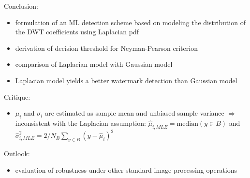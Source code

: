 \begin{frame}{\insertsection}

\textcolor{TUDblue}{Conclusion:}
\begin{itemize}
\item formulation of an ML detection scheme based on modeling the distribution of the DWT coefficients using Laplacian pdf
\item derivation of decision threshold for Neyman-Pearson criterion
\item comparison of Laplacian model with Gaussian model
\item Laplacian model yields a better watermark detection than Gaussian model
\end{itemize}

\textcolor{TUDblue}{Critique:}

\begin{itemize}
 \item $\mu_i$ and $\sigma_i$ are estimated as sample mean and unbiased sample variance 
\newline \textcolor{TUDblue}{$\Rightarrow$} inconsistent with the Laplacian assumption:
\newline $\hat{\mu}_{i, MLE} = \text{median}(y\in B)$ and $\hat{\sigma}^2_{i, MLE} = 2/N_B \sum_{y\in B} (y-\hat{\mu}_i)^2$ 

\end{itemize}
\textcolor{TUDblue}{Outlook:}
\begin{itemize}
 \item evaluation of robustness under other standard image processing operations
\end{itemize}
\end{frame}



